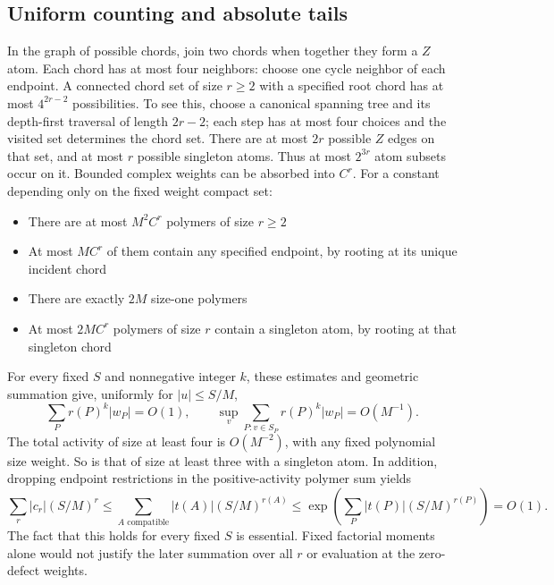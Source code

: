 \documentclass[11pt,letterpaper]{article}
\numberwithin{equation}{section}
\theoremstyle{definition}\newtheorem{definition}[theorem]{Definition}
\theoremstyle{remark}\newtheorem{remark}[theorem]{Remark}
\begin{document}
\subsection{Uniform counting and absolute tails}\label{cgr:fc:sec:polymer-bounds}
In the graph of possible chords, join two chords when together
they form a $Z$ atom. Each chord has at most four neighbors: choose
one cycle neighbor of each endpoint. A connected chord set of size
$r\ge2$ with a specified root chord has at most $4^{2r-2}$
possibilities. To see this, choose a canonical spanning tree and
its depth-first traversal of length $2r-2$; each step has at most
four choices and the visited set determines the chord set.
There are at most $2r$ possible $Z$ edges on that set, and at most
$r$ possible singleton atoms. Thus at most $2^{3r}$ atom subsets
occur on it. Bounded complex weights can be absorbed into $C^r$.
For a constant depending only on the fixed weight compact set:
\begin{itemize}
\item There are at most $M^2C^r$ polymers of size $r\ge2$
\item At most $MC^r$ of them contain any specified endpoint,
by rooting at its unique incident chord
\item There are exactly $2M$ size-one polymers
\item At most $2MC^r$ polymers of size $r$ contain a singleton
atom, by rooting at that singleton chord
\end{itemize}
For every fixed $S$ and nonnegative integer $k$, these estimates
and geometric summation give, uniformly for $|u|\le S/M$,
\begin{equation}\label{cgr:fc:eq:polymer-bounds}
 \sum_P r(P)^k|w_P|=O(1),\qquad
 \sup_v\sum_{P:v\in S_P}r(P)^k|w_P|=O(M^{-1}).
\end{equation}
The total activity of size at least four is $O(M^{-2})$, with any
fixed polynomial size weight. So is that of size at least three
with a singleton atom. In addition, dropping endpoint restrictions
in the positive-activity polymer sum yields
\begin{equation}\label{cgr:fc:eq:absolute-coeff}
 \sum_r|c_r|(S/M)^r
 \le\sum_{A\text{ compatible}}|t(A)|(S/M)^{r(A)}
 \le\exp\left(\sum_P|t(P)|(S/M)^{r(P)}\right)=O(1).
\end{equation}
The fact that this holds for every fixed $S$ is essential. Fixed
factorial moments alone would not justify the later summation over
all $r$ or evaluation at the zero-defect weights.
\end{document}
